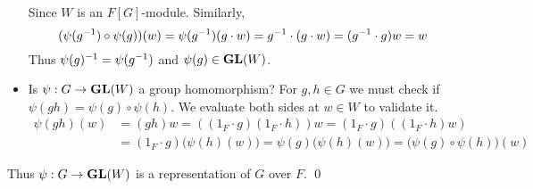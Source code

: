 \begin{itemize}
	Since $W$ is an $F[G]$-module. Similarly,
	$$(\psi(g^{-1})\circ \psi(g))(w) = \psi(g^{-1})(g\cdot w) = g^{-1}\cdot(g\cdot w) = (g^{-1} \cdot g)w = w$$
	Thus $\psi(g)^{-1} = \psi(g^{-1})$ and $\psi(g)\in \mathrm{\mathbf{GL}}(W)$.
	\item Is $\psi: G\rightarrow \mathrm{\mathbf{GL}}(W)$ a group homomorphism? For $g, h\in G$ we must check if $\psi(gh)=\psi(g)\circ\psi(h)$. We evaluate both sides at $w\in W$ to validate it.
	$$\begin{aligned}
	\psi(gh)(w) &= (gh)w = ((1_F\cdot g)(1_F\cdot h))w = (1_F\cdot g)((1_F\cdot h)w)\\
	&= (1_F\cdot g)\big(\psi(h)(w)\big) = \psi(g)\big(\psi(h)(w)\big) = \big(\psi(g)\circ\psi(h)\big)(w)
	\end{aligned}$$
\end{itemize}
Thus $\psi: G\rightarrow \mathrm{\mathbf{GL}}(W)$ is a representation of $G$ over $F$. \qed\\
\\
\pagebreak


